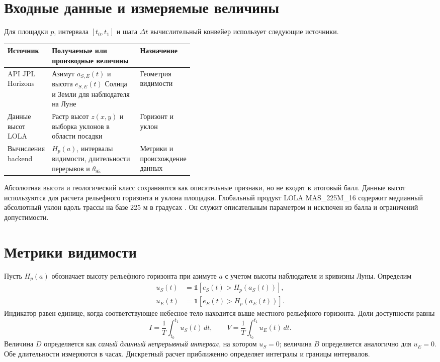 \documentclass[10pt,a4paper]{article}
\newcommand{\code}[1]{{\ttfamily\small #1}}
\begin{document}
\section{Входные данные и измеряемые величины}
Для площадки $p$, интервала $[t_0,t_1]$ и шага $\Delta t$ вычислительный конвейер использует следующие источники.

\small
\begin{tabularx}{\linewidth}{@{}L{0.23\linewidth}Y L{0.20\linewidth}@{}}
\toprule
\textbf{Источник} & \textbf{Получаемые или производные величины} & \textbf{Назначение}\\
\midrule
API JPL Horizons \cite{horizons} & Азимут $a_{S,E}(t)$ и высота $e_{S,E}(t)$ Солнца и Земли для наблюдателя на Луне & Геометрия видимости\\
Данные высот LOLA \cite{smith2010} & Растр высот $z(x,y)$ и выборка уклонов в области посадки & Горизонт и уклон\\
Вычисления backend & $H_p(a)$, интервалы видимости, длительности перерывов и $\theta_{95}$ & Метрики и происхождение данных\\
\bottomrule
\end{tabularx}
\normalsize

Абсолютная высота и геологический класс сохраняются как описательные признаки, но не входят в итоговый балл. Данные высот используются для расчета рельефного горизонта и уклона площадки. Глобальный продукт LOLA \code{MAS\_225M\_16} содержит медианный абсолютный уклон вдоль трассы на базе 225 м в градусах \cite{rosenburg2011,pgda}. Он служит описательным параметром и исключен из балла и ограничений допустимости.

\newpage

\section{Метрики видимости}
Пусть $H_p(a)$ обозначает высоту рельефного горизонта при азимуте $a$ с учетом высоты наблюдателя и кривизны Луны. Определим
\begin{align}
u_S(t)&=\mathbb{1}\!\left[e_S(t)>H_p(a_S(t))\right],\\
u_E(t)&=\mathbb{1}\!\left[e_E(t)>H_p(a_E(t))\right].
\end{align}
Индикатор равен единице, когда соответствующее небесное тело находится выше местного рельефного горизонта. Доли доступности равны
\begin{equation}
I=\frac{1}{T}\int_{t_0}^{t_1}u_S(t)\,dt,
\qquad
V=\frac{1}{T}\int_{t_0}^{t_1}u_E(t)\,dt.
\end{equation}
Величина $D$ определяется как \emph{самый длинный непрерывный интервал}, на котором $u_S=0$; величина $B$ определяется аналогично для $u_E=0$. Обе длительности измеряются в часах. Дискретный расчет приближенно определяет интегралы и границы интервалов.
\end{document}
